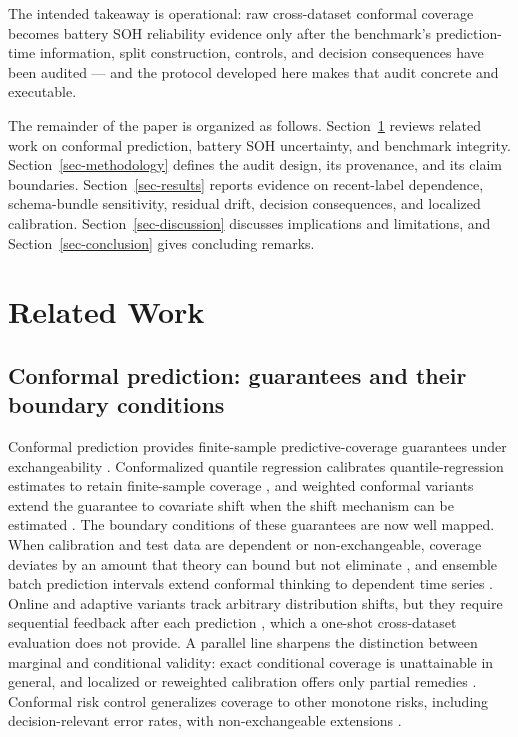 \documentclass[
  number,
  preprint]{elsarticle}
\begin{document}
The intended takeaway is operational: raw cross-dataset conformal
coverage becomes battery SOH reliability evidence only after the
benchmark's prediction-time information, split construction, controls,
and decision consequences have been audited --- and the protocol
developed here makes that audit concrete and executable.

The remainder of the paper is organized as follows.
Section~\ref{sec-related-work} reviews related work on conformal
prediction, battery SOH uncertainty, and benchmark integrity.
Section~\ref{sec-methodology} defines the audit design, its provenance,
and its claim boundaries. Section~\ref{sec-results} reports evidence on
recent-label dependence, schema-bundle sensitivity, residual drift,
decision consequences, and localized calibration.
Section~\ref{sec-discussion} discusses implications and limitations, and
Section~\ref{sec-conclusion} gives concluding remarks.

\section{Related Work}\label{sec-related-work}

\subsection{Conformal prediction: guarantees and their boundary
conditions}\label{conformal-prediction-guarantees-and-their-boundary-conditions}

Conformal prediction provides finite-sample predictive-coverage
guarantees under exchangeability
\citep{vovk2005algorithmic, lei2018distributionfree, angelopoulos2023conformal}.
Conformalized quantile regression calibrates quantile-regression
estimates to retain finite-sample coverage
\citep{romano2019conformalized}, and weighted conformal variants extend
the guarantee to covariate shift when the shift mechanism can be
estimated \citep{tibshirani2019covariate}. The boundary conditions of
these guarantees are now well mapped. When calibration and test data are
dependent or non-exchangeable, coverage deviates by an amount that
theory can bound but not eliminate
\citep{barber2023beyond, oliveira2024split}, and ensemble batch
prediction intervals extend conformal thinking to dependent time series
\citep{xu2023conformal}. Online and adaptive variants track arbitrary
distribution shifts, but they require sequential feedback after each
prediction \citep{gibbs2021adaptive, gibbs2024conformal}, which a
one-shot cross-dataset evaluation does not provide. A parallel line
sharpens the distinction between marginal and conditional validity:
exact conditional coverage is unattainable in general, and localized or
reweighted calibration offers only partial remedies
\citep{gibbs2025conformal, guan2022localized, hore2024conformal}.
Conformal risk control generalizes coverage to other monotone risks,
including decision-relevant error rates, with non-exchangeable
extensions
\citep{angelopoulos2024conformalrisk, farinhas2024nonexchangeable}.
\end{document}
